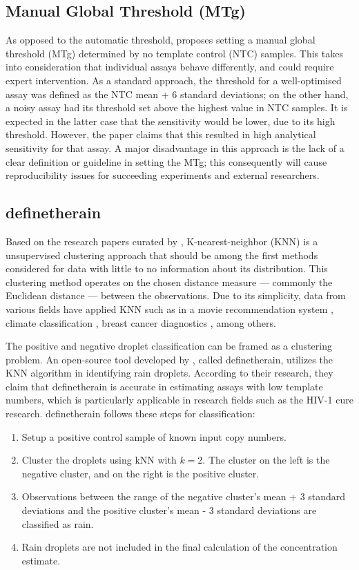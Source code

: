 \subsection{Manual Global Threshold (MTg)}
\label{sec:manthreshold}
As opposed to the automatic threshold,  proposes setting a manual global threshold (MTg) determined by no template control (NTC) samples. This takes into consideration that individual assays behave differently, and could require expert intervention. As a standard approach, the threshold for a well-optimised assay was defined as the NTC mean + 6 standard deviations; on the other hand, a noisy assay had its threshold set above the highest value in NTC samples. It is expected in the latter case that the sensitivity would be lower, due to its high threshold. However, the paper claims that this resulted in high analytical sensitivity for that assay. A major disadvantage in this approach is the lack of a clear definition or guideline in setting the MTg; this consequently will cause reproducibility issues for succeeding experiments and external researchers.


\subsection{definetherain}
\label{sec:knn}
Based on the research papers curated by , K-nearest-neighbor (KNN) is a unsupervised clustering approach that should be among the first methods considered for data with little to no information about its distribution. This clustering method operates on the chosen distance measure — commonly the Euclidean distance — between the observations. Due to its simplicity, data from various fields have applied KNN such as in a movie recommendation system \cite{Ahuja2019}, climate classification \cite{Shi2020}, breast cancer diagnostics \cite{Mittal2019}, among others.

The positive and negative droplet classification can be framed as a clustering problem. An open-source tool developed by , called definetherain, utilizes the KNN algorithm in identifying rain droplets. According to their research, they claim that definetherain is accurate in estimating assays with low template numbers, which is particularly applicable in research fields such as the HIV-1 cure research. definetherain follows these steps for classification:
\begin{enumerate}
    \item Setup a positive control sample of known input copy numbers. 
    \item Cluster the droplets using kNN with \(k=2\). The cluster on the left is the negative cluster, and on the right is the positive cluster. 
    \item Observations between the range of the negative cluster's mean + 3 standard deviations and the positive cluster's mean - 3 standard deviations are classified as rain.
    \item Rain droplets are not included in the final calculation of the concentration estimate.
\end{enumerate}

